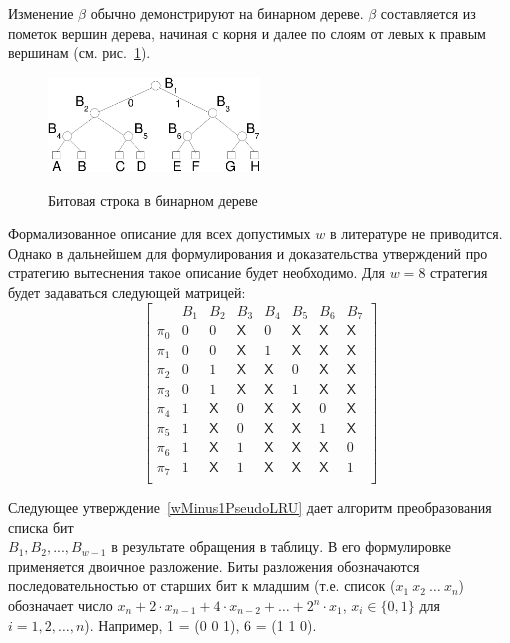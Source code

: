 Изменение $\beta$ обычно демонстрируют на бинарном дереве. $\beta$ составляется из пометок вершин дерева, начиная с корня и далее по слоям от левых к правым вершинам (см.
рис.~\ref{plru_bittree}).

\begin{figure}[h] \center
  \includegraphics[width=0.5\textwidth]{1.review/plru}\\
  \caption{Битовая строка в бинарном дереве}\label{plru_bittree}
\end{figure}

Формализованное описание для всех допустимых $w$ в литературе не
приводится. Однако в дальнейшем для формулирования и доказательства
утверждений про стратегию вытеснения \PseudoLRU такое описание будет
необходимо. Для $w=8$ стратегия будет задаваться следующей матрицей:
$$
\left[
  \begin{array}{c|ccccccc}
          & B_1 & B_2 & B_3 & B_4 & B_5 & B_6 & B_7 \\ \hline
    \pi_0 & 0 & 0 & \textsf{X} & 0 & \textsf{X} & \textsf{X} & \textsf{X} \\
    \pi_1 & 0 & 0 & \textsf{X} & 1 & \textsf{X} & \textsf{X} & \textsf{X} \\
    \pi_2 & 0 & 1 & \textsf{X} & \textsf{X} & 0 & \textsf{X} & \textsf{X} \\
    \pi_3 & 0 & 1 & \textsf{X} & \textsf{X} & 1 & \textsf{X} & \textsf{X} \\
    \pi_4 & 1 & \textsf{X} & 0 & \textsf{X} & \textsf{X} & 0 & \textsf{X} \\
    \pi_5 & 1 & \textsf{X} & 0 & \textsf{X} & \textsf{X} & 1 & \textsf{X} \\
    \pi_6 & 1 & \textsf{X} & 1 & \textsf{X} & \textsf{X} & \textsf{X} & 0 \\
    \pi_7 & 1 & \textsf{X} & 1 & \textsf{X} & \textsf{X} & \textsf{X} & 1 \\
  \end{array}
\right]
$$

Следующее утверждение~\ref{wMinus1PseudoLRU} дает алгоритм
преобразования списка бит\\ $B_1, B_2, ..., B_{w{-}1}$ в результате
обращения в таблицу. В его формулировке применяется двоичное
разложение. Биты разложения обозначаются последовательностью от
старших бит к младшим (т.е. список ($x_1~x_2~\dots~x_n$) обозначает
число $x_n + 2\cdot x_{n-1} + 4\cdot x_{n-2} + \dots + 2^n\cdot x_1$, $x_i \in
\{0,
1\}$ для $i = 1, 2, \dots, n$). Например, 1 = (0 0 1), 6 = (1 1 0).

